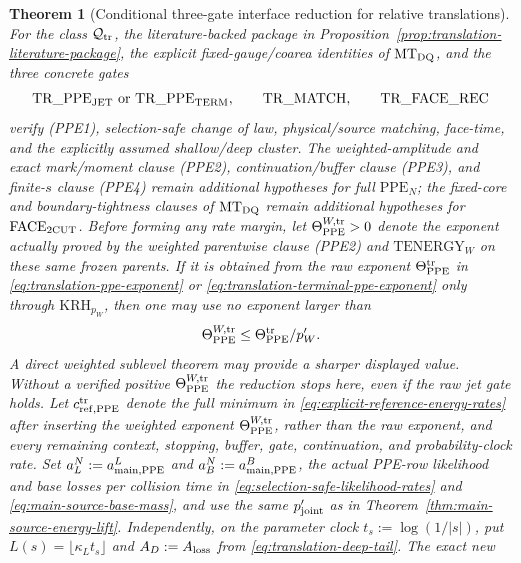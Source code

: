 \documentclass[11pt]{article}
\newtheorem{theorem}{Theorem}[section]
\begin{document}
\begin{theorem}[Conditional three-gate interface reduction for relative translations]
\label{thm:translation-three-gate-reduction}
For the class $\mathcal Q_{\rm tr}$, the literature-backed package in
Proposition~\ref{prop:translation-literature-package}, the explicit
fixed-gauge/coarea identities of $\mathrm{MT}_{\rm DQ}$, and the three
concrete gates
\[
 \mathrm{TR\_PPE}_{\rm JET}\ \text{or}\
 \mathrm{TR\_PPE}_{\rm TERM},\qquad
 \mathrm{TR\_MATCH},\qquad
 \mathrm{TR\_FACE\_REC}
\]
verify \textup{(PPE1)}, selection-safe change of law, physical/source
matching, face-time, and the explicitly assumed shallow/deep cluster.  The
weighted-amplitude and exact mark/moment clause \textup{(PPE2)}, continuation/buffer clause
\textup{(PPE3)}, and finite-$s$ clause \textup{(PPE4)} remain additional
hypotheses for full $\mathrm{PPE}_N$; the fixed-core and boundary-tightness
clauses of $\mathrm{MT}_{\rm DQ}$ remain additional hypotheses for
$\mathrm{FACE}_{\rm 2CUT}$.  Before forming any rate margin, let
$\Theta_{\rm PPE}^{W,\rm tr}>0$ denote the exponent actually proved by the
weighted parentwise clause \textup{(PPE2)} and
$\mathrm{TENERGY}_{W}$ on these same frozen parents.  If it is obtained from
the raw exponent $\Theta_{\rm PPE}^{\rm tr}$ in
\eqref{eq:translation-ppe-exponent} or
\eqref{eq:translation-terminal-ppe-exponent} only through
$\mathrm{KRH}_{p_W}$, then one may use no exponent larger than
\begin{equation}
 \Theta_{\rm PPE}^{W,\rm tr}
 \le \Theta_{\rm PPE}^{\rm tr}/p_W'.
\label{eq:translation-weighted-ppe-exponent}
\end{equation}
A direct weighted sublevel theorem may provide a sharper displayed value.
Without a verified positive $\Theta_{\rm PPE}^{W,\rm tr}$ the reduction stops
here, even if the raw jet gate holds.  Let
$c_{{\rm ref},{\rm PPE}}^{\rm tr}$ denote the \emph{full}
minimum in \eqref{eq:explicit-reference-energy-rates} after inserting the
weighted exponent $\Theta_{\rm PPE}^{W,\rm tr}$, rather than the raw exponent,
and every remaining
context, stopping, buffer, gate, continuation, and probability-clock rate.
Set
$a_L^N:=a_{{\rm main},{\rm PPE}}^L$ and
$a_B^N:=a_{{\rm main},{\rm PPE}}^B$, the actual PPE-row likelihood and
base losses per collision time in
\eqref{eq:selection-safe-likelihood-rates} and
\eqref{eq:main-source-base-mass}, and use the same $p_{\rm joint}'$ as in
Theorem~\ref{thm:main-source-energy-lift}.  Independently, on the parameter
clock $t_s:=\log(1/|s|)$, put
$L(s)=\lfloor\kappa_Lt_s\rfloor$ and
$A_D:=A_{\rm loss}$ from \eqref{eq:translation-deep-tail}.  The exact new

\end{theorem}
\end{document}

